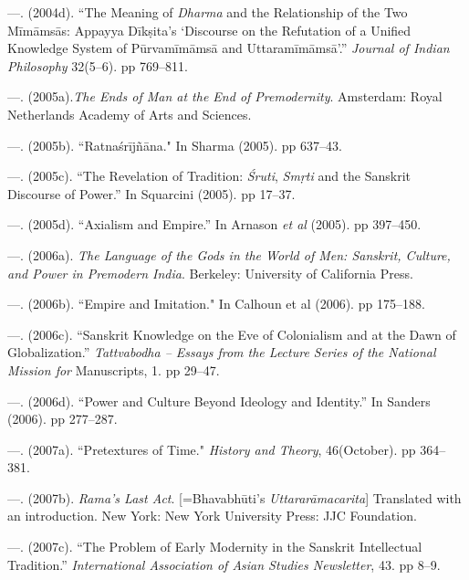 \begin{thebibliography}{99}
 \item —. (2004d). “The Meaning of \textit{Dharma} and the Relationship of the Two Mīmāmsās: Appayya Dīkṣita’s ‘Discourse on the Refutation of a Unified Knowledge System of Pūrvamīmāmsā and Uttaramīmāmsā'.” \textit{Journal of Indian Philosophy} 32(5–6). pp 769–811.

 \item —. (2005a).\textit{The Ends of Man at the End of Premodernity}. Amsterdam: Royal Netherlands Academy of Arts and Sciences.

 \item —. (2005b). “Ratnaśrījñāna." In Sharma (2005). pp 637–43.

 \item —. (2005c). “The Revelation of Tradition: \textit{Śruti}, \textit{Smṛti} and the Sanskrit Discourse of Power.” In Squarcini (2005). pp 17–37.

 \item —. (2005d). “Axialism and Empire.” In Arnason \textit{et al} (2005). pp 397–450.

 \item —. (2006a). \textit{The Language of the Gods in the World of Men: Sanskrit, Culture, and Power in Premodern India}. Berkeley: University of California Press.

 \item —. (2006b). “Empire and Imitation." In Calhoun et al (2006). pp 175–188.

 \item —. (2006c). “Sanskrit Knowledge on the Eve of Colonialism and at the Dawn of Globalization.” \textit{Tattvabodha – Essays from the Lecture Series of the National Mission for }Manuscripts, 1. pp 29–47.

 \item —. (2006d). “Power and Culture Beyond Ideology and Identity.” In Sanders (2006). pp 277–287.

 \item —. (2007a). “Pretextures of Time." \textit{History and Theory}, 46(October). pp 364–381.

 \item —. (2007b).\textit{ Rama’s Last Act}. [=Bhavabhūti’s \textit{Uttararāmacarita}] Translated with an introduction. New York: New York University Press: JJC Foundation.

 \item —. (2007c). “The Problem of Early Modernity in the Sanskrit Intellectual Tradition.” \textit{International Association of Asian Studies Newsletter}, 43. pp 8–9.


\end{thebibliography}
